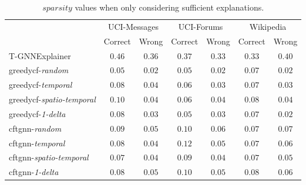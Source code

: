 \begin{table}[ht]
    \centering
    \small
    \begin{tabular}{lcccccc}
    \hline
         &  \multicolumn{2}{c}{UCI-Messages}&  \multicolumn{2}{c}{UCI-Forums}&  \multicolumn{2}{c}{Wikipedia}\\
         &  Correct&  Wrong&  Correct&  Wrong&  Correct& Wrong\\
         \hline
         T-GNNExplainer&  $0.46$&  $0.36$&  $0.37$&  $0.33$&  $0.33$& $0.40$\\
         \gls{greedycf}-\textit{random}&  $0.05$&  $0.02$&  $0.05$&  $0.02$&  $0.07$& $0.02$\\
         \gls{greedycf}-\textit{temporal}&  $0.08$&  $0.04$&  $0.06$&  $0.03$&  $0.07$& $0.03$\\
         \gls{greedycf}-\textit{spatio-temporal}&  $0.10$&  $0.04$&  $0.06$&  $0.04$&  $0.08$& $0.04$\\
         \gls{greedycf}-\textit{1-delta}&  $0.08$&  $0.03$&  $0.05$&  $0.03$&  $0.07$& $0.02$\\
         \gls{cftgnn}-\textit{random}&  $0.09$&  $0.05$&  $0.10$&  $0.06$&  $0.07$& $0.07$\\
         \gls{cftgnn}-\textit{temporal}&  $0.08$&  $0.04$&  $0.12$&  $0.05$&  $0.07$& $0.06$\\
         \gls{cftgnn}-\textit{spatio-temporal}&  $0.07$&  $0.04$&  $0.09$&  $0.04$&  $0.07$& $0.05$\\
 \gls{cftgnn}-\textit{1-delta}& $0.08$& $0.05$& $0.10$& $0.05$& $0.08$&$0.06$\\
 \hline
    \end{tabular}
    \caption{$sparsity$ values when only considering sufficient explanations.}
    \label{t_spar_suf}
\end{table}
